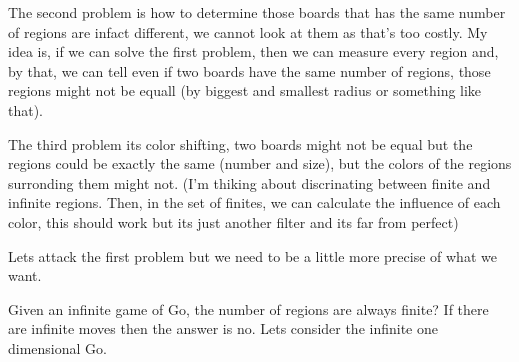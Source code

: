 The second problem is how to determine those boards that has the same number of regions are infact different, we cannot look at them as that's too costly. My idea is, if we can solve the first problem, then we can measure every region and, by that, we can tell even if two boards have the same number of regions, those regions might not be equall (by biggest and smallest radius or something like that). 

The third problem its color shifting, two boards might not be equal but the regions could be exactly the same (number and size), but the colors of the regions surronding them might not. (I'm thiking about discrinating between finite and infinite regions. Then, in the set of finites, we can calculate the influence of each color, this should work but its just another filter and its far from perfect)


 Lets attack the first problem but we need to be a little more precise of what we want.
 
Given an infinite game of Go, the number of regions are always finite? If there are infinite moves then the answer is no. Lets consider the infinite one dimensional Go.

